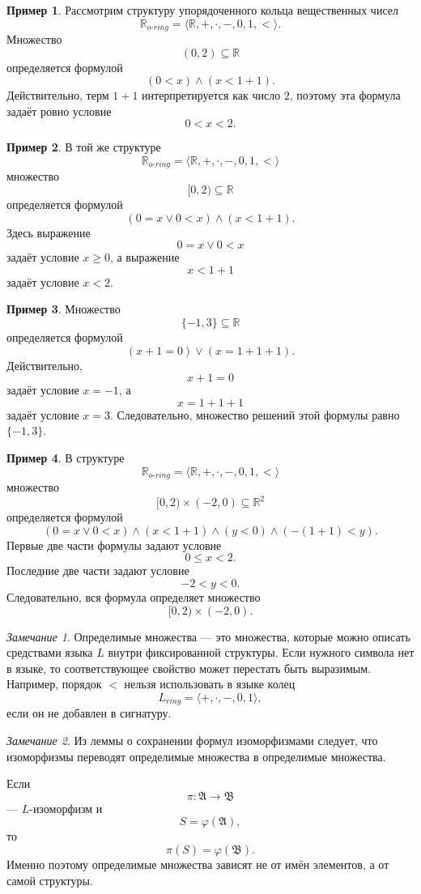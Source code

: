 \documentclass[12pt,a4paper,oneside,openany]{book}
\theoremstyle{definition}
\newtheorem{example}{Пример}[chapter]
\theoremstyle{plain}
\theoremstyle{remark}
\newtheorem{remark}{Замечание}[chapter]
\begin{document}
\begin{example}
Рассмотрим структуру упорядоченного кольца вещественных чисел
\[
\mathbb R_{o\text{-}ring}
=
\langle \mathbb R,+,\cdot,-,0,1,<\rangle.
\]
Множество
\[
(0,2)\subseteq\mathbb R
\]
определяется формулой
\[
(0<x)\wedge(x<1+1).
\]
Действительно, терм $1+1$ интерпретируется как число $2$, поэтому эта формула задаёт ровно условие
\[
0<x<2.
\]
\end{example}

\begin{example}
В той же структуре
\[
\mathbb R_{o\text{-}ring}
=
\langle \mathbb R,+,\cdot,-,0,1,<\rangle
\]
множество
\[
[0,2)\subseteq\mathbb R
\]
определяется формулой
\[
(0=x\vee 0<x)\wedge(x<1+1).
\]
Здесь выражение
\[
0=x\vee 0<x
\]
задаёт условие $x\ge 0$, а выражение
\[
x<1+1
\]
задаёт условие $x<2$.
\end{example}

\begin{example}
Множество
\[
\{-1,3\}\subseteq\mathbb R
\]
определяется формулой
\[
(x+1=0)\vee(x=1+1+1).
\]
Действительно,
\[
x+1=0
\]
задаёт условие $x=-1$, а
\[
x=1+1+1
\]
задаёт условие $x=3$.
Следовательно, множество решений этой формулы равно $\{-1,3\}$.
\end{example}

\begin{example}
В структуре
\[
\mathbb R_{o\text{-}ring}
=
\langle \mathbb R,+,\cdot,-,0,1,<\rangle
\]
множество
\[
[0,2)\times(-2,0)\subseteq\mathbb R^2
\]
определяется формулой
\[
(0=x\vee 0<x)\wedge(x<1+1)\wedge(y<0)\wedge(-(1+1)<y).
\]
Первые две части формулы задают условие
\[
0\le x<2.
\]
Последние две части задают условие
\[
-2<y<0.
\]
Следовательно, вся формула определяет множество
\[
[0,2)\times(-2,0).
\]
\end{example}

\begin{remark}
Определимые множества — это множества, которые можно описать средствами языка $L$ внутри фиксированной структуры.
Если нужного символа нет в языке, то соответствующее свойство может перестать быть выразимым.
Например, порядок $<$ нельзя использовать в языке колец
\[
L_{ring}=\langle +,\cdot,-,0,1\rangle,
\]
если он не добавлен в сигнатуру.
\end{remark}

\begin{remark}
Из леммы о сохранении формул изоморфизмами следует, что изоморфизмы переводят определимые множества в определимые множества.

Если
\[
\pi:\mathfrak A\to\mathfrak B
\]
— $L$-изоморфизм и
\[
S=\varphi(\mathfrak A),
\]
то
\[
\pi(S)=\varphi(\mathfrak B).
\]
Именно поэтому определимые множества зависят не от имён элементов, а от самой структуры.
\end{remark}
\end{document}
